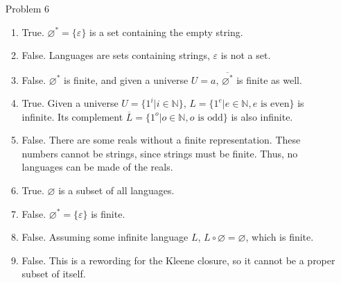 \documentclass[12pt,letterpaper]{article}
\begin{document}
\begin{enumerate}
    \item[Problem 6]
      \begin{enumerate}
        \item True.
          $\varnothing^* = \{\varepsilon\}$ is a set containing the empty string.
        \item False.
          Languages are sets containing strings, $\varepsilon$ is not a set.
        \item False.
          $\varnothing^*$ is finite, and given a universe $U = {a}$, $\overline{\varnothing^*}$ is finite as well.
        \item True.
          Given a universe $U = \{1^i | i \in \mathbb{N}\}$, $L = \{1^e | e \in \mathbb{N}, e \text{ is even}\}$ is infinite.
          Its complement $\overline{L} = \{1^o | o \in \mathbb{N}, o \text{ is odd}\}$ is also infinite.
        \item False.
          There are some reals without a finite representation.
          These numbers cannot be strings, since strings must be finite.
          Thus, no languages can be made of the reals.
        \item True.
          $\varnothing$ is a subset of all languages.
        \item False.
          $\varnothing^* = \{\varepsilon\}$ is finite.
        \item False.
          Assuming some infinite language $L$, $L \circ \varnothing = \varnothing$, which is finite.
        \item False.
          This is a rewording for the Kleene closure, so it cannot be a proper subset of itself.
      \end{enumerate}
  \end{enumerate}
\end{document}
